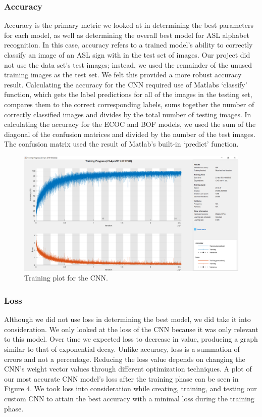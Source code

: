 \documentclass[conference]{IEEEtran}
\begin{document}
\subsubsection{Accuracy}
Accuracy is the primary metric we looked at in determining the best parameters for each model, as well as determining the overall best model for ASL alphabet recognition. In this case, accuracy refers to a trained model’s ability to correctly classify an image of an ASL sign with in the test set of images. Our project did not use the data set’s test images; instead, we used the remainder of the unused training images as the test set. We felt this provided a more robust accuracy result. Calculating the accuracy for the CNN required use of Matlabs ‘classify’ function, which gets the label predictions for all of the images in the testing set, compares them to the correct corresponding labels, sums together the number of correctly classified images and divides by the total number of testing images. In calculating the accuracy for the ECOC and BOF models, we used the sum of the diagonal of the confusion matrices and divided by the number of the test images. The confusion matrix used the result of Matlab’s built-in ‘predict’ function.
\begin{figure}[t]
\centering
\includegraphics[width=\linewidth]{FinalTraining}
\caption{Training plot for the CNN.}
\end{figure}
\subsubsection{Loss}
Although we did not use loss in determining the best model, we did take it into consideration. We only looked at the loss of the CNN because it was only relevant to this model. Over time we expected loss to decrease in value, producing a graph similar to that of exponential decay. Unlike accuracy, loss is a summation of errors and not a percentage. Reducing the loss value depends on changing the CNN’s weight vector values through different optimization techniques. A plot of our most accurate CNN model’s loss after the training phase can be seen in Figure 4. We took loss into consideration while creating, training, and testing our custom CNN to attain the best accuracy with a minimal loss during the training phase.
\end{document}
